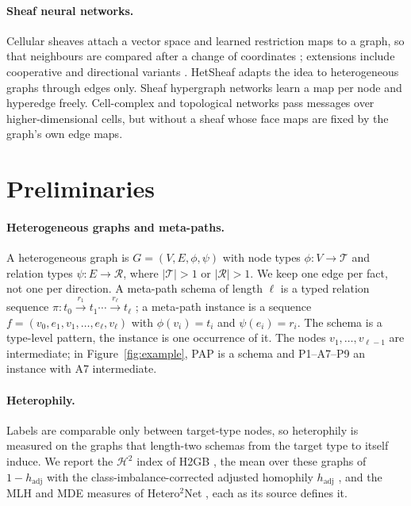 \documentclass{article}
\begin{document}
\paragraph{Sheaf neural networks.} Cellular sheaves attach a vector space and learned restriction maps to a graph, so that neighbours are compared after a change of coordinates \cite{hansen2020sheaf,bodnar2022neural,barbero2022sheaf}; extensions include cooperative and directional variants \cite{ribeiro2026cooperative,fiorini2025sheaves}. HetSheaf \cite{braithwaite2024heterogeneous} adapts the idea to heterogeneous graphs through edges only. Sheaf hypergraph networks \cite{duta2023sheafhyper} learn a map per node and hyperedge freely. Cell-complex and topological networks \cite{bodnar2021cwn,hajij2022tdl,hajij2025ctnn} pass messages over higher-dimensional cells, but without a sheaf whose face maps are fixed by the graph's own edge maps.

\section{Preliminaries}
\label{sec:background}

\paragraph{Heterogeneous graphs and meta-paths.} A heterogeneous graph is $G=(V,E,\phi,\psi)$ with node types $\phi:V\to\mathcal{T}$ and relation types $\psi:E\to\mathcal{R}$, where $|\mathcal{T}|>1$ or $|\mathcal{R}|>1$. We keep one edge per fact, not one per direction. A meta-path schema of length $\ell$ is a typed relation sequence $\pi: t_0\xrightarrow{r_1}t_1\cdots\xrightarrow{r_\ell}t_\ell$ \cite{sun2011pathsim}; a meta-path instance is a sequence $f=(v_0,e_1,v_1,\ldots,e_\ell,v_\ell)$ with $\phi(v_i)=t_i$ and $\psi(e_i)=r_i$. The schema is a type-level pattern, the instance is one occurrence of it. The nodes $v_1,\dots,v_{\ell-1}$ are intermediate; in Figure~\ref{fig:example}, PAP is a schema and P1--A7--P9 an instance with A7 intermediate.

\paragraph{Heterophily.} Labels are comparable only between target-type nodes, so heterophily is measured on the graphs that length-two schemas from the target type to itself induce. We report the $\mathcal{H}^2$ index of H2GB \cite{lin2025heterophily}, the mean over these graphs of $1-h_{\mathrm{adj}}$ with the class-imbalance-corrected adjusted homophily $h_{\mathrm{adj}}$ \cite{platonov2023characterizing}, and the MLH and MDE measures of Hetero$^2$Net \cite{li2025hetero2net}, each as its source defines it.
\end{document}
